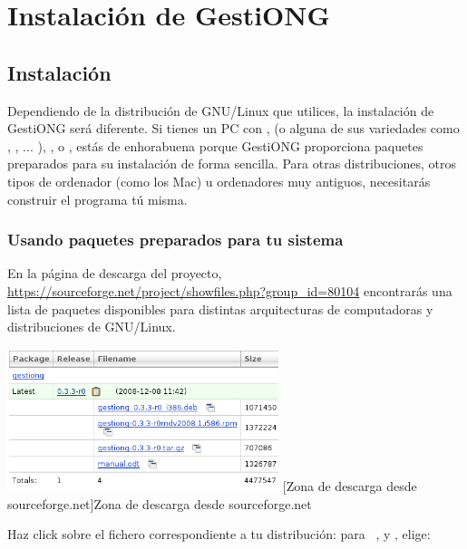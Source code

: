 \chapter{Instalación de GestiONG}

\section{Instalación}
Dependiendo de la distribución de GNU/Linux que utilices, la
instalación de GestiONG será diferente. Si tienes un PC con
,  (o
alguna de sus variedades como ,
, ... ),
,  o
, estás de enhorabuena porque
GestiONG proporciona paquetes preparados para su instalación de forma
sencilla. Para otras distribuciones, otros tipos de ordenador (como los
Mac) u ordenadores muy antiguos, necesitarás construir el programa
tú misma.

\subsection{Usando paquetes preparados para tu sistema}
En la página de descarga del proyecto,
\href{http://sourceforge.net/project/showfiles.php?group_id=80104&package_id=81685&release_id=578703}{https://sourceforge.net/project/showfiles.php?group\_id=80104}
encontrarás una lista de paquetes disponibles para distintas
arquitecturas de computadoras y distribuciones de GNU/Linux. 



\begin{center}
\includegraphics[width=7.915cm,height=4.166cm]{manual-img1.png}
[Zona de descarga desde sourceforge.net]{Zona de
descarga desde sourceforge.net}

\end{center}
Haz click sobre el fichero correspondiente a tu distribución: para
\ , 
y , elige:

